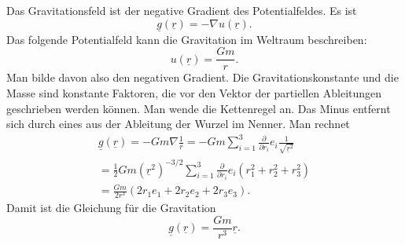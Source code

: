 \documentclass[a4paper,10pt,fleqn,twocolumn,twoside]{article}
\begin{document}
Das Gravitationsfeld ist der negative Gradient des Potentialfeldes.
Es ist
\[\underline g(\underline r) = -\nabla u(\underline r).\]
Das folgende Potentialfeld kann die Gravitation im Weltraum
beschreiben:
\[u(\underline r) = \frac{Gm}{r}.\]
Man bilde davon also den negativen Gradient. Die Gravitationskonstante
und die Masse sind konstante Faktoren, die vor den Vektor der
partiellen Ableitungen geschrieben werden können. Man wende die
Kettenregel an. Das Minus entfernt sich durch eines aus der
Ableitung der Wurzel im Nenner. Man rechnet
\begin{gather*}
\underline g(\underline r)
= -Gm\nabla\frac{1}{r}
= -Gm\sum_{i=1}^3 \frac{\partial}{\partial r_i}
e_i \frac{1}{\sqrt{\underline r^2}}\\
= \frac{1}{2}Gm (\underline r^2)^{-3/2}
\sum_{i=1}^3 \frac{\partial}{\partial r_i} e_i (r_1^2+r_2^2+r_3^2)\\
= \frac{Gm}{2r^3}(2r_1e_1 + 2r_2e_2 + 2r_3e_3).
\end{gather*}
Damit ist die Gleichung für die Gravitation
\[\underline g(\underline r) = \frac{Gm}{r^3} \underline r.\]
\end{document}
